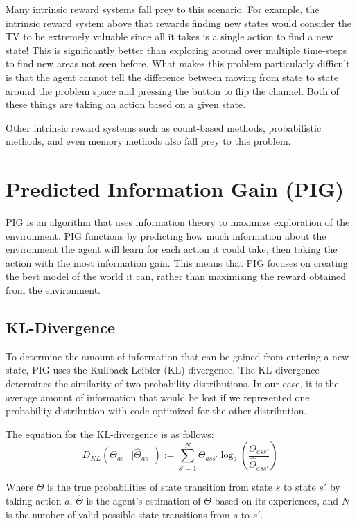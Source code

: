 \documentclass[12pt]{thesis}
\begin{document}
Many intrinsic reward systems fall prey to this scenario. For example, the intrinsic reward system above that rewards finding new states would consider the TV to be extremely valuable since all it takes is a single action to find a new state! This is significantly better than exploring around over multiple time-steps to find new areas not seen before. What makes this problem particularly difficult is that the agent cannot tell the difference between moving from state to state around the problem space and pressing the button to flip the channel. Both of these things are taking an action based on a given state.

Other intrinsic reward systems such as count-based methods, probabilistic methods, and even memory methods also fall prey to this problem.  \cite{DBLP:journals/corr/abs-1908-06976}

\section{Predicted Information Gain (PIG)}
PIG is an algorithm that uses information theory to maximize exploration of the environment. \cite{10.3389/fncir.2013.00037} PIG functions by predicting how much information about the environment the agent will learn for each action it could take, then taking the action with the most information gain. This means that PIG focuses on creating the best model of the world it can, rather than maximizing the reward obtained from the environment.

\subsection{KL-Divergence}
To determine the amount of information that can be gained from entering a new state, PIG uses the Kullback-Leibler (KL) divergence. The KL-divergence determines the similarity of two probability distributions. In our case, it is the average amount of information that would be lost if we represented one probability distribution with code optimized for the other distribution.

The equation for the KL-divergence is as follows:
\[D_{KL} (\Theta_{as\cdot} || \hat{\Theta}_{as\cdot}) := \sum_{s' = 1}^{ N} \Theta_{ass'} \log_{2}(\frac{\Theta_{ass'}}{\hat{\Theta}_{ass'}})   \]

Where $\Theta$ is the true probabilities of state transition from state $s$ to state $s'$ by taking action $a$, $\hat{\Theta}$ is the agent's estimation of $\Theta$ based on its experiences, and $N$ is the number of valid possible state transitions from $s$ to $s'$.
\end{document}

